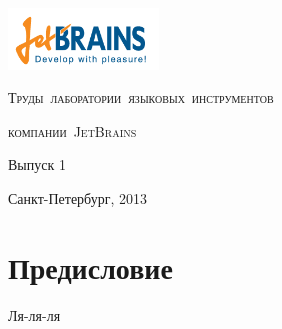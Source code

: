 \documentclass{llncs}
\begin{document}
\sloppy

\begin{titlepage}

\centering

\includegraphics[width=4cm]{JBLogoWhite.png}

\vskip 4cm

\mbox{\LARGE{\textsc{Труды лаборатории языковых инструментов}}}
\vskip 0.5cm

\mbox{\LARGE{\textsc{компании JetBrains}}}
\vskip 3cm

\Large{Выпуск 1}
\vskip 7cm

\Large{Санкт-Петербург, 2013}
\end{titlepage}

\chapter*{Предисловие}

Ля-ля-ля

\tableofcontents















\end{document}
